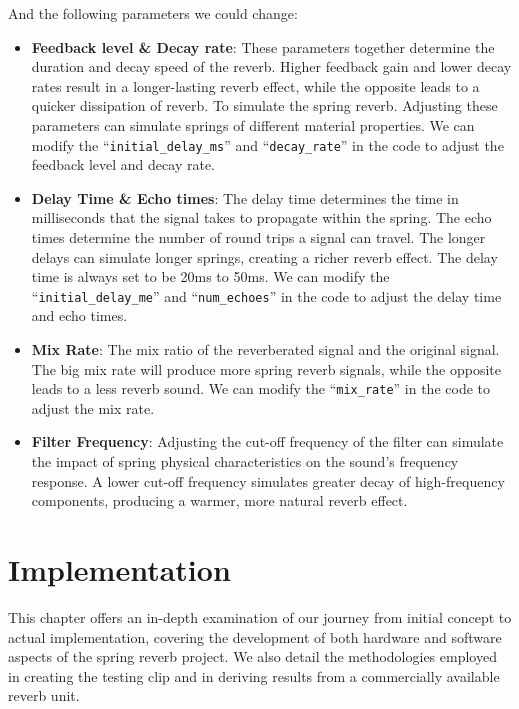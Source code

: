 \documentclass[12pt]{article}
\begin{document}
And the following parameters we could change:

\begin{itemize}
	\item \textbf{Feedback level \& Decay rate}:  These parameters together determine the duration and decay speed of the reverb. Higher feedback gain and lower decay rates result in a longer-lasting reverb effect, while the opposite leads to a quicker dissipation of reverb. To simulate the spring reverb. Adjusting these parameters can simulate springs of different material properties. We can modify the ``\texttt{initial\_delay\_ms}'' and ``\texttt{decay\_rate}'' in the code to adjust the feedback level and decay rate.
	
	\item \textbf{Delay Time \& Echo times}: The delay time determines the time in milliseconds that the signal takes to propagate within the spring. The echo times determine the number of round trips a signal can travel. The longer delays can simulate longer springs, creating a richer reverb effect. The delay time is always set to be 20ms to 50ms. We can modify the ``\texttt{initial\_delay\_me}'' and ``\texttt{num\_echoes}'' in the code to adjust the delay time and echo times.
	
	\item \textbf{Mix Rate}: The mix ratio of the reverberated signal and the original signal. The big mix rate will produce more spring reverb signals, while the opposite leads to a less reverb sound. We can modify the ``\texttt{mix\_rate}'' in the code to adjust the mix rate.

	\item \textbf{Filter Frequency}: Adjusting the cut-off frequency of the filter can simulate the impact of spring physical characteristics on the sound's frequency response. A lower cut-off frequency simulates greater decay of high-frequency components, producing a warmer, more natural reverb effect.
	
\end{itemize}

\newpage
\section{Implementation}

 This chapter offers an in-depth examination of our journey from initial concept to actual implementation, covering the development of both hardware and software aspects of the spring reverb project. We also detail the methodologies employed in creating the testing clip and in deriving results from a commercially available reverb unit.
\end{document}
